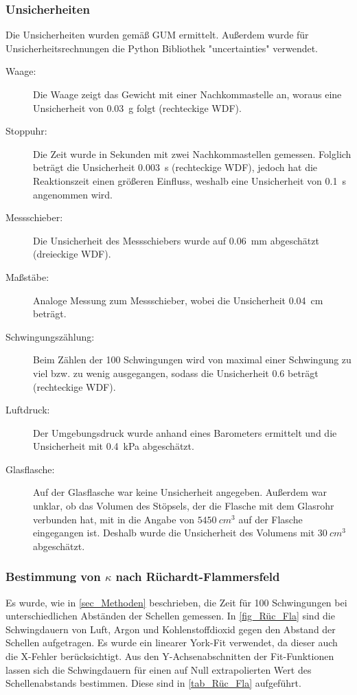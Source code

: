 \documentclass[
	a4paper,
	12pt,
	pagesize,
	ngerman
]{scrartcl}
\begin{document}
	\subsubsection{Unsicherheiten} %
	Die Unsicherheiten wurden gemäß GUM ermittelt. 
	Außerdem wurde für Unsicherheitsrechnungen die Python Bibliothek "uncertainties" verwendet.
	\begin{description}
		\item[Waage:] Die Waage zeigt das Gewicht mit einer Nachkommastelle an, woraus eine Unsicherheit von \SI{0,03}{g} folgt (rechteckige WDF).
		\item[Stoppuhr:] Die Zeit wurde in Sekunden mit zwei Nachkommastellen gemessen. Folglich beträgt die Unsicherheit \SI{0,003}{s} (rechteckige WDF), jedoch hat die Reaktionszeit einen größeren Einfluss, weshalb eine Unsicherheit von \SI{0,1}{s} angenommen wird.
		\item[Messschieber:] Die Unsicherheit des Messschiebers wurde auf \SI{0,06}{mm}  abgeschätzt (dreieckige WDF).
		\item[Maßstäbe:]  Analoge Messung zum Messschieber, wobei die Unsicherheit \SI{0,04}{cm} beträgt.
		\item[Schwingungszählung:] Beim Zählen der 100 Schwingungen wird von maximal einer Schwingung zu viel bzw. zu wenig ausgegangen, sodass die Unsicherheit \SI{0,6}{} beträgt (rechteckige WDF).
		\item[Luftdruck:] Der Umgebungsdruck wurde anhand eines Barometers ermittelt und die Unsicherheit mit \SI{0,4}{kPa} abgeschätzt.
		\item[Glasflasche:] Auf der Glasflasche war keine Unsicherheit angegeben. Außerdem war unklar, ob das Volumen des Stöpsels, der die Flasche mit dem Glasrohr verbunden hat, mit in die Angabe von $\SI{5450}{cm^3}$ auf der Flasche eingegangen ist. Deshalb wurde die Unsicherheit des Volumens mit $\SI{30}{cm^3}$ abgeschätzt.
	\end{description}
	
	\subsubsection{Bestimmung von $\kappa$ nach Rüchardt-Flammersfeld}
	Es wurde, wie in \cref{sec_Methoden} beschrieben, die Zeit für 100 Schwingungen bei unterschiedlichen Abständen der Schellen gemessen.
	In \cref{fig_Rüc_Fla} sind die Schwingdauern von Luft, Argon und Kohlenstoffdioxid gegen den Abstand der Schellen aufgetragen. 
	Es wurde ein linearer York-Fit verwendet, da dieser auch die X-Fehler berücksichtigt.
	Aus den Y-Achsenabschnitten der Fit-Funktionen lassen sich die Schwingdauern für einen auf Null extrapolierten Wert des Schellenabstands bestimmen.
	Diese sind in \cref{tab_Rüc_Fla} aufgeführt.
	
\end{document}
